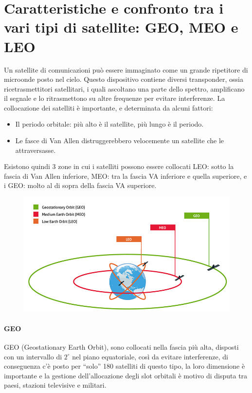 \section{Caratteristiche e confronto tra i vari tipi di satellite: GEO, MEO e LEO}

Un satellite di comunicazioni può essere immaginato come un grande ripetitore di microonde posto nel cielo. Questo dispositivo contiene diversi transponder, ossia ricetrasmettitori satellitari, i quali ascoltano una parte dello spettro, amplificano il segnale e lo ritrasmettono su altre frequenze per evitare interferenze.
La collocazione dei satelliti è importante, e determinata da alcuni fattori:
\begin{itemize}
\item	Il periodo orbitale: più alto è il satellite, più lungo è il periodo.
\item	Le fasce di Van Allen distruggerebbero velocemente un satellite che le attraversasse.
\end{itemize}
Esistono quindi 3 zone in cui i satelliti possono essere collocati LEO: sotto la fascia di Van Allen inferiore, MEO: tra la fascia VA inferiore e quella superiore, e i GEO: molto al di sopra della fascia VA superiore.

\begin{figure}[H]
\centering
\includegraphics[scale=0.55]{res/img/4_satelliti.png}
\end{figure}
 
\paragraph{GEO}
GEO (Geostationary Earth Orbit), sono collocati nella fascia più alta, disposti con un intervallo di $2^{\circ}$ nel piano equatoriale, così da evitare interferenze, di conseguenza c’è posto per “solo” 180 satelliti di questo tipo, la loro dimensione è importante e la gestione dell’allocazione degli slot orbitali è motivo di disputa tra paesi, stazioni televisive e militari.
